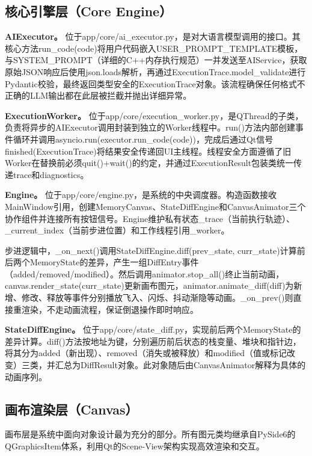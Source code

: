 \documentclass[12pt,a4paper]{ctexart}
\begin{document}
\subsection{核心引擎层（Core Engine）}

\textbf{AIExecutor。} 位于app/core/ai\_executor.py，是对大语言模型调用的接口。其核心方法run\_code(code)将用户代码嵌入USER\_PROMPT\_TEMPLATE模板，与SYSTEM\_PROMPT（详细的C++内存执行规范）一并发送至AIService，获取原始JSON响应后使用json.loads解析，再通过ExecutionTrace.model\_validate进行Pydantic校验，最终返回类型安全的ExecutionTrace对象。该流程确保任何格式不正确的LLM输出都在此层被拦截并抛出详细异常。

\textbf{ExecutionWorker。} 位于app/core/execution\_worker.py，是QThread的子类，负责将异步的AIExecutor调用封装到独立的Worker线程中。run()方法内部创建事件循环并调用asyncio.run(executor.run\_code(code))，完成后通过Qt信号finished(ExecutionTrace)将结果安全传递回UI主线程。线程安全方面遵循了旧Worker在替换前必须quit()+wait()的约定，并通过ExecutionResult包装类统一传递trace和diagnostics。

\textbf{Engine。} 位于app/core/engine.py，是系统的中央调度器。构造函数接收MainWindow引用，创建MemoryCanvas、StateDiffEngine和CanvasAnimator三个协作组件并连接所有按钮信号。Engine维护私有状态\_trace（当前执行轨迹）、\_current\_index（当前步进位置）和工作线程引用\_worker。

步进逻辑中，\_on\_next()调用StateDiffEngine.diff(prev\_state, curr\_state)计算前后两个MemoryState的差异，产生一组DiffEntry事件（added/removed/modified）。然后调用animator.stop\_all()终止当前动画，canvas.render\_state(curr\_state)更新画布图元，animator.animate\_diff(diff)为新增、修改、释放等事件分别播放飞入、闪烁、抖动渐隐等动画。\_on\_prev()则直接重渲染，不走动画流程，保证倒退操作即时响应。

\textbf{StateDiffEngine。} 位于app/core/state\_diff.py，实现前后两个MemoryState的差异计算。diff()方法按地址为键，分别遍历前后状态的栈变量、堆块和指针边，将其分为added（新出现）、removed（消失或被释放）和modified（值或标记改变）三类，并汇总为DiffResult对象。此对象随后由CanvasAnimator解释为具体的动画序列。

\subsection{画布渲染层（Canvas）}

画布层是系统中面向对象设计最为充分的部分。所有图元类均继承自PySide6的QGraphicsItem体系，利用Qt的Scene-View架构实现高效渲染和交互。
\end{document}
